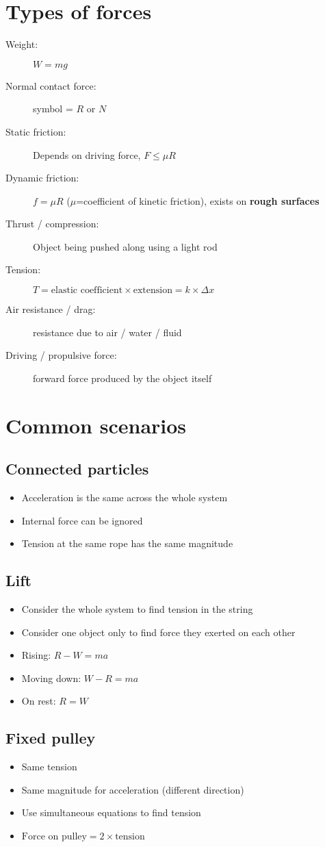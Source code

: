 \section{Types of forces}
\begin{description}
	\item[Weight:] $W=mg$
	\item[Normal contact force:] symbol = $R$ or $N$
	\item[Static friction:] Depends on driving force, $F\leq \mu R$
	\item[Dynamic friction:] $f=\mu R$ ($\mu$=coefficient of kinetic friction), exists on \textbf{rough surfaces}
	\item[Thrust / compression:] Object being pushed along using a light rod
	\item[Tension:] $T=\text{elastic coefficient}\times\text{extension}=k\times\Delta x$
	\item[Air resistance / drag:] resistance due to air / water / fluid
	\item[Driving / propulsive force:] forward force produced by the object itself
\end{description}

\section{Common scenarios}
\subsection{Connected particles}
\begin{itemize}
	\item Acceleration is the same across the whole system
	\item Internal force can be ignored
	\item Tension at the same rope has the same magnitude
\end{itemize}

\subsection{Lift}
\begin{itemize}
	\item Consider the whole system to find tension in the string
	\item Consider one object only to find force they exerted on each other
	\item Rising: $R-W=ma$
	\item Moving down: $W-R=ma$
	\item On rest: $R=W$
\end{itemize}

\subsection{Fixed pulley}
\begin{itemize}
	\item Same tension
	\item Same magnitude for acceleration (different direction)
	\item Use simultaneous equations to find tension
	\item $\text{Force on pulley} = 2 \times \text{tension}$
\end{itemize}